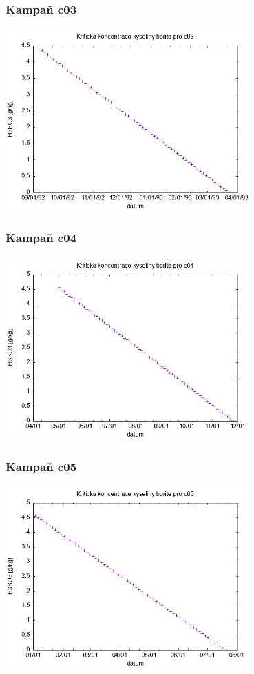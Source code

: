 \documentclass[a4paper,twoside,11pt]{article}
\begin{document}
\subsubsection{Kampaň c03}

\includegraphics[width=0.7\textwidth]{../plots/bc_c03}

\subsubsection{Kampaň c04}

\includegraphics[width=0.7\textwidth]{../plots/bc_c04}

\subsubsection{Kampaň c05}

\includegraphics[width=0.7\textwidth]{../plots/bc_c05}
\end{document}
